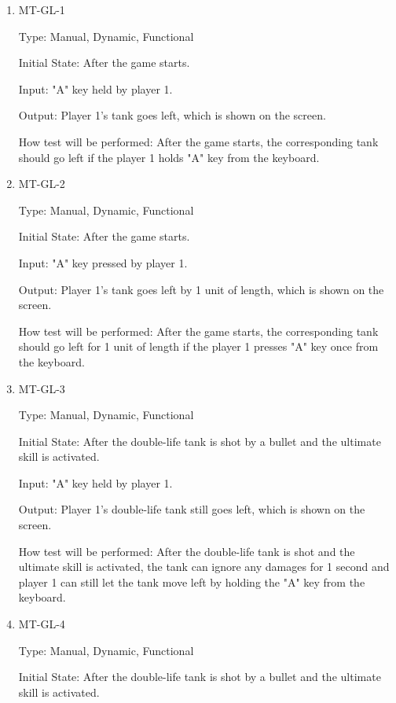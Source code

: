 \documentclass[12pt, titlepage]{article}
\begin{document}
\begin{enumerate}

\item{MT-GL-1\\}

Type: Manual, Dynamic, Functional
					
Initial State: After the game starts.
					
Input: "A" key held by player 1.
					
Output: Player 1's tank goes left, which is shown on the screen.
					
How test will be performed: After the game starts, the corresponding tank should go left if the player 1 holds "A" key from the keyboard. 
					
\item{MT-GL-2\\}

Type: Manual, Dynamic, Functional
					
Initial State: After the game starts.
					
Input: "A" key pressed by player 1.
					
Output: Player 1's tank goes left by 1 unit of length, which is shown on the screen.
					
How test will be performed: After the game starts, the corresponding tank should go left for 1 unit of length if the player 1 presses "A" key once from the keyboard. 

\item{MT-GL-3\\}

Type: Manual, Dynamic, Functional
					
Initial State: After the double-life tank is shot by a bullet and the ultimate skill is activated.
					
Input: "A" key held by player 1.
					
Output: Player 1's double-life tank still goes left, which is shown on the screen.
					
How test will be performed: After the double-life tank is shot and the ultimate skill is activated, the tank can ignore any damages for 1 second and player 1 can still let the tank move left by holding the "A" key from the keyboard.

\item{MT-GL-4\\}

Type: Manual, Dynamic, Functional
					
Initial State: After the double-life tank is shot by a bullet and the ultimate skill is activated.
					

\end{enumerate}
\end{document}
